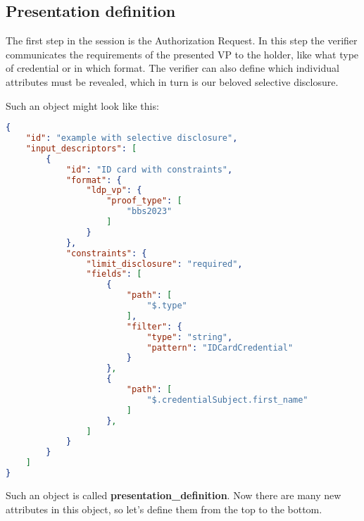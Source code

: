 \documentclass[
	a4paper               %
	,BCOR=0mm            %
	,bibliography=totoc   %
	,listof=totoc         %
	,monolingual
	,twoside=false
]{bfhthesis}              %
\begin{document}
\subsection{Presentation definition}
The first step in the session is the Authorization Request. 
In this step the verifier communicates the requirements of the presented VP to the holder, like what type of credential or in which format.
The verifier can also define which individual attributes must be revealed, which in turn is our beloved selective disclosure.

Such an object might look like this:
\begin{lstlisting}[language=json,firstnumber=1,caption={Example of a presentation definition},captionpos=b, label={list:presdef}]
{
	"id": "example with selective disclosure",
	"input_descriptors": [
		{
			"id": "ID card with constraints",
			"format": {
				"ldp_vp": {
					"proof_type": [
						"bbs2023"
					]
				}
			},
			"constraints": {
				"limit_disclosure": "required",
				"fields": [
					{
						"path": [
							"$.type"
						],
						"filter": {
							"type": "string",
							"pattern": "IDCardCredential"
						}
					},
					{
						"path": [
							"$.credentialSubject.first_name"
						]
					},
				]
			}
		}
	]
}
\end{lstlisting}

Such an object is called \textbf{presentation\_definition}.
Now there are many new attributes in this object, so let's define them from the top to the bottom. \\
\end{document}
